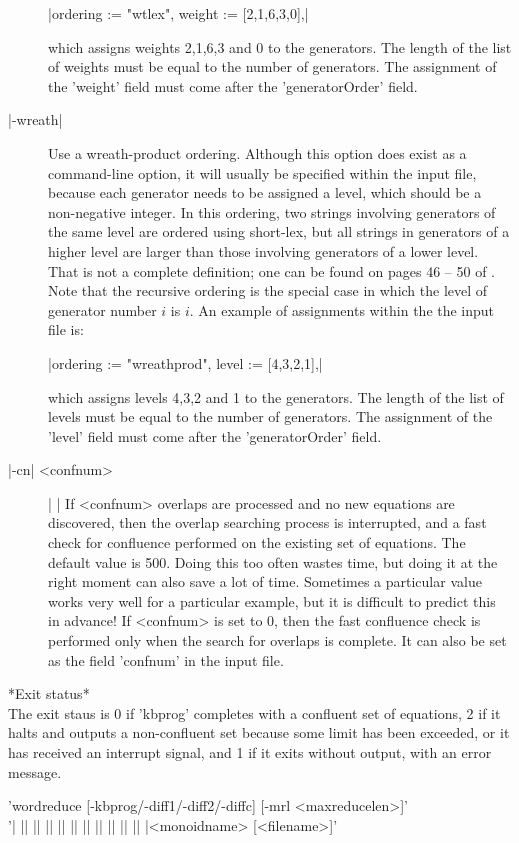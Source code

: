 \begin{description}
|ordering := "wtlex", weight := [2,1,6,3,0],|

which assigns weights 2,1,6,3 and 0 to the generators. The length of the
list of weights must be equal to the number of generators. The assignment
of the 'weight' field must come after the 'generatorOrder' field.
\item[|-wreath|]
Use a wreath-product ordering.
Although this option does exist as a command-line option, it will usually
be specified within the input file, because each generator needs to be
assigned a level, which should be a non-negative integer.
In this ordering, two strings involving generators of the same level are
ordered using short-lex, but all strings in generators of a higher level are
larger than those involving generators of a lower level. That is not a
complete definition; one can be found  on pages 46 -- 50 of \cite{Sims94}.
Note that the recursive ordering is the special case in which the level
of generator number $i$ is $i$.
An example of assignments within the the input file is:

|ordering := "wreathprod", level := [4,3,2,1],|

which assigns levels 4,3,2 and 1 to the generators. The length of the
list of levels must be equal to the number of generators. The assignment
of the 'level' field must come after the 'generatorOrder' field.
\item[|-cn| <confnum>] | |\newline
If <confnum> overlaps are processed and no new equations are discovered, then
the overlap searching process is interrupted, and a fast check for
confluence performed on the existing set of equations.
The default value is 500. Doing this too often wastes time, but doing it
at the right moment can also save a lot of time. Sometimes a particular
value works very well for a particular example, but it is difficult
to predict this in advance! If <confnum> is set to 0, then the fast
confluence check is performed only when the search for overlaps is
complete.
It can also be set as the field 'confnum' in the input file.
\end{description}

*Exit status*\\
The exit staus is 0 if 'kbprog' completes with a confluent set of equations,
2 if it halts and outputs a non-confluent set because some limit has
been exceeded, or it has received an interrupt signal, and 1 if it exits
without output, with an error message.

'wordreduce  [-kbprog/-diff1/-diff2/-diffc] [-mrl <maxreducelen>]'\\ 
'| || || || || || || || || || || |<monoidname> [<filename>]'

